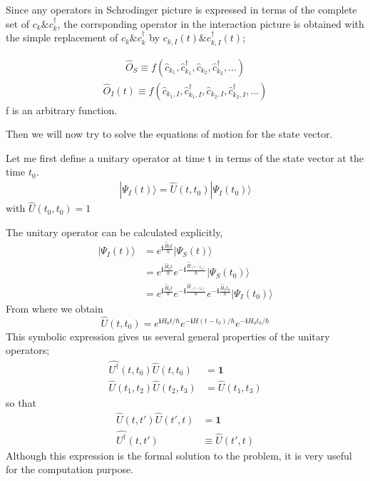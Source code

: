  Since any operators in Schrodinger picture is expressed in terms of the complete set of $c_k \& c^{\dagger}_k$, the corrsponding operator in the interaction picture is obtained with the simple replacement of $c_k \& c^{\dagger}_k$ by $c_{k,I}(t) \& c^{\dagger}_{k,I}(t)$;

\begin{align}
\hat O_S \equiv f(\hat c_{k_1},\hat c^{\dagger}_{k_1},\hat c_{k_2},\hat c^{\dagger}_{k_2},...)\nonumber
\end{align}
\begin{align}
\hat O_I(t) \equiv f(\hat c_{k_1,I},\hat c^{\dagger}_{k_1,I},\hat c_{k_2,I},\hat c^{\dagger}_{k_2,I},...)\nonumber
\end{align}
f is an arbitrary function.

 Then we will now try to solve the equations of motion for the state vector.

 Let me first define a unitary operator at time t in terms of the state vector at the time $t_0$.
\begin{align}
|\Psi_I(t)\rangle=\hat U(t,t_0)|\Psi_I(t_0)\rangle
\end{align}
with $\hat U(t_0,t_0)=1$

 The unitary operator can be calculated explicitly,
\begin{align}
|\Psi_I(t)\rangle& =e^{\bm{i}  \frac{\hat H_0t}{\hbar}}|\Psi_S(t)\rangle \nonumber \\
&= e^{\bm{i}  \frac{\hat H_0t}{\hbar}}e^{-\bm{i}  \frac{\hat H_(t-t_0)}{\hbar}}|\Psi_S(t_0)\rangle \nonumber \\& = e^{\bm{i}  \frac{\hat H_0t}{\hbar}}e^{-\bm{i}  \frac{\hat H_(t-t_0)}{\hbar}}e^{-\bm{i}  \frac{\hat H_0t_0}{\hbar}}|\Psi_I(t_0)\rangle \nonumber
\end{align}
From where we obtain
\begin{equation} \tag{2.1.6'}
\hat{U}(t,t_0)=e^{\bm{i}H_0t/\hbar}e^{-\bm{i}H(t-t_0)/\hbar}e^{-\bm{i}H_0t_0/\hbar} \nonumber
\end{equation}
 This symbolic expression gives us several general properties of the unitary operators;
\begin{align}
\hat{U^{\dagger}}(t,t_0)\hat{U}(t,t_0)&=\bm{1} \nonumber\\
\hat{U}(t_1,t_2)\hat{U}(t_2,t_3)&=\hat{U}(t_1,t_3)\nonumber
\end{align}
so that 
\begin{align}
\hat{U}(t,t')\hat{U}(t',t)&=\bm{1} \nonumber \\
\hat{U^{\dagger}}(t,t') & \equiv \hat{U}(t',t) \nonumber
\end{align}
 Although this expression is the formal solution to the problem, it is very useful for the computation purpose.

